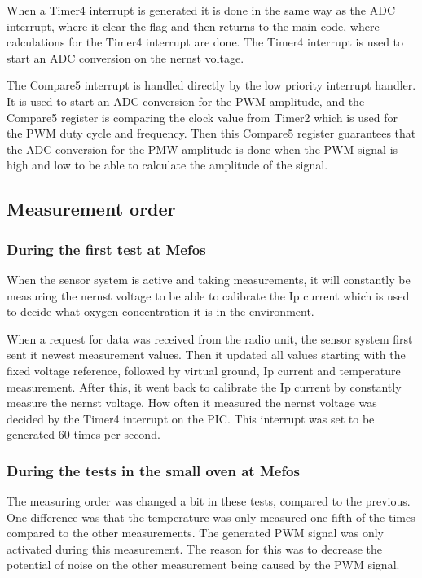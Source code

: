 When a Timer4 interrupt is generated it is done in the same way as the ADC interrupt, where it clear the flag and then returns to the main code, where calculations for the Timer4 interrupt are done. The Timer4 interrupt is used to start an ADC conversion on the nernst voltage.

The Compare5 interrupt is handled directly by the low priority interrupt handler. It is used to start an ADC conversion for the PWM amplitude, and the Compare5 register is comparing the clock value from Timer2 which is used for the PWM duty cycle and frequency. Then this Compare5 register guarantees that the ADC conversion for the PMW amplitude is done when the PWM signal is high and low to be able to calculate the amplitude of the signal.

\subsection{Measurement order}

\subsubsection{During the first test at Mefos}
When the sensor system is active and taking measurements, it will constantly be measuring the nernst voltage to be able to calibrate the Ip current which is used to decide what oxygen concentration it is in the environment.

When a request for data was received from the radio unit, the sensor system first sent it newest measurement values. Then it updated all values starting with the fixed voltage reference, followed by virtual ground, Ip current and temperature measurement. After this, it went back to calibrate the Ip current by constantly measure the nernst voltage. How often it measured the nernst voltage was decided by the Timer4 interrupt on the PIC. This interrupt was set to be generated 60 times per second.


\subsubsection{During the tests in the small oven at Mefos}
The measuring order was changed a bit in these tests, compared to the previous. One difference was that the temperature was only measured one fifth of the times compared to the other measurements. The generated PWM signal was only activated during this measurement. The reason for this was to decrease the potential of noise on the other measurement being caused by the PWM signal.


